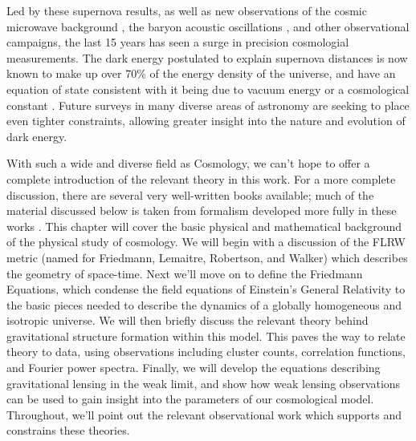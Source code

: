 Led by these supernova results, as well as new observations of the cosmic
microwave background \citep[CMB;][]{WMAP1}, the baryon acoustic oscillations
\citep[BAO;][]{Eisenstein05}, and other observational
campaigns, the last 15 years has seen a surge in precision cosmologial
measurements.
The dark energy postulated to explain supernova distances is now known
to make up over 70\% of the energy density of the universe, and have
an equation of state consistent with it being due to
vacuum energy or a cosmological constant \citep{Kessler2009, WMAP7}.
Future surveys in many diverse areas of astronomy are seeking to place even
tighter constraints, allowing greater insight into the nature and evolution
of dark energy.

With such a wide and diverse field as Cosmology, we can't hope to offer
a complete introduction of the relevant theory in this work.
For a more complete discussion, there
are several very well-written books available; much of the material
discussed below is taken from formalism developed more fully in these works
\citep[see, e.g.][]{peebles1993principles, peacock1999cosmological,
  ryden2003cosmology, longair2008galaxy}.
This chapter will cover the basic physical and mathematical background of
the physical study of cosmology.  We will begin with a discussion of the
FLRW metric (named for Friedmann, Lemaitre,
Robertson, and Walker) which describes the geometry of space-time.
Next we'll move on to define the Friedmann Equations, which condense
the field equations of Einstein's General Relativity to the basic pieces
needed to describe the dynamics of a globally homogeneous and isotropic
universe.  We will then briefly discuss the relevant theory behind
gravitational structure formation within this model.
This paves the way to relate theory to data, using observations
including cluster counts, correlation functions, and Fourier power spectra.
Finally, we will develop the equations describing gravitational lensing
in the weak limit, and show how weak lensing observations can be used
to gain insight into the parameters of our cosmological model.
Throughout, we'll point out the relevant observational work which supports
and constrains these theories.

